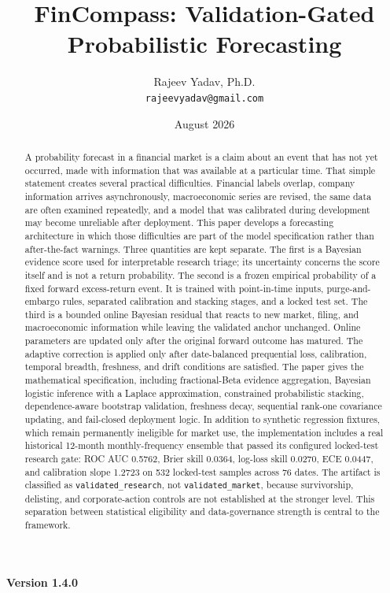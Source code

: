 \documentclass[11pt]{article}
\title{\textbf{FinCompass: Validation-Gated Probabilistic Forecasting}}
\author{Rajeev Yadav, Ph.D.\\\texttt{rajeevyadav@gmail.com}}
\date{August 2026}
\begin{document}
\maketitle
\begin{center}
\textbf{Version 1.4.0}
\end{center}

\begin{abstract}
A probability forecast in a financial market is a claim about an event that has not yet occurred, made with information that was available at a particular time. That simple statement creates several practical difficulties. Financial labels overlap, company information arrives asynchronously, macroeconomic series are revised, the same data are often examined repeatedly, and a model that was calibrated during development may become unreliable after deployment. This paper develops a forecasting architecture in which those difficulties are part of the model specification rather than after-the-fact warnings. Three quantities are kept separate. The first is a Bayesian evidence score used for interpretable research triage; its uncertainty concerns the score itself and is not a return probability. The second is a frozen empirical probability of a fixed forward excess-return event. It is trained with point-in-time inputs, purge-and-embargo rules, separated calibration and stacking stages, and a locked test set. The third is a bounded online Bayesian residual that reacts to new market, filing, and macroeconomic information while leaving the validated anchor unchanged. Online parameters are updated only after the original forward outcome has matured. The adaptive correction is applied only after date-balanced prequential loss, calibration, temporal breadth, freshness, and drift conditions are satisfied. The paper gives the mathematical specification, including fractional-Beta evidence aggregation, Bayesian logistic inference with a Laplace approximation, constrained probabilistic stacking, dependence-aware bootstrap validation, freshness decay, sequential rank-one covariance updating, and fail-closed deployment logic. In addition to synthetic regression fixtures, which remain permanently ineligible for market use, the implementation includes a real historical 12-month monthly-frequency ensemble that passed its configured locked-test research gate: ROC AUC 0.5762, Brier skill 0.0364, log-loss skill 0.0270, ECE 0.0447, and calibration slope 1.2723 on 532 locked-test samples across 76 dates. The artifact is classified as \texttt{validated\_research}, not \texttt{validated\_market}, because survivorship, delisting, and corporate-action controls are not established at the stronger level. This separation between statistical eligibility and data-governance strength is central to the framework.
\end{abstract}
\end{document}
